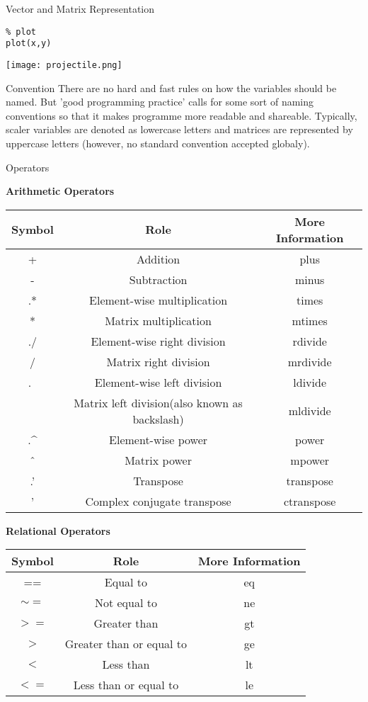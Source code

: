 \documentclass[11pt,titlepage,fleqn]{article}
\begin{document}
\begin{section}{Vector and Matrix Representation}
\begin{verbatim}
% plot
plot(x,y)
\end{verbatim}

\texttt{[image: projectile.png]}

\begin{subsection}{Convention}
There are no hard and fast rules on how the variables should be named. But 'good programming practice' calls for some sort of naming conventions so that it makes programme more readable and shareable.
Typically, scaler variables are denoted as lowercase letters and matrices are represented by uppercase letters (however, no standard convention accepted globaly).

\end{subsection}
\end{section}

\begin{section}{Operators}

{\bf Arithmetic Operators}
\begin{tabular}{|c|c|c|}
\hline
Symbol  &	Role  &	More Information \\
\hline
+  &	Addition  &	plus\\
-  &	Subtraction  &	minus\\
.*  &	Element-wise multiplication  &	times\\
*  &	Matrix multiplication  &	mtimes\\
./  &	Element-wise right division  & rdivide\\
/  &	Matrix right division  &	mrdivide\\
.\  &	Element-wise left division  &	ldivide\\
\  &	Matrix left division(also known as backslash)  &	mldivide\\
.\^ &	Element-wise power  &	power\\
\^ \ &	Matrix power  &	mpower\\
.'  &	Transpose  &	transpose\\
'  &	Complex conjugate transpose  &	ctranspose\\
\hline
\end{tabular}

{\bf Relational Operators}
\begin{tabular}{|c|c|c|}
\hline
Symbol  &	Role  &	More Information \\
\hline
== &	Equal to &	eq\\
$\sim=$ &	Not equal to &	ne\\
$>=$ &	Greater than &	gt\\
$>$ &	Greater than or equal to &	ge\\
$<$ &	Less than &	lt\\
$<=$ &	Less than or equal to & le\\
\hline
\end{tabular}


\end{section}
\end{document}
